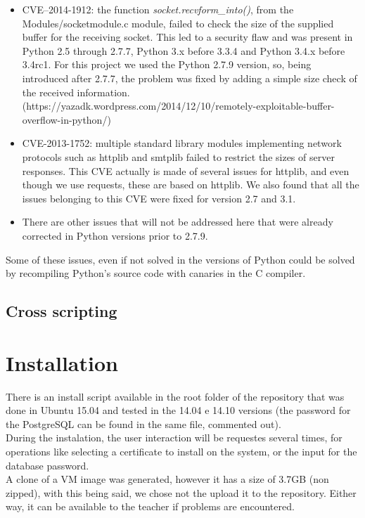 \documentclass[11pt,a4paper]{report}
\begin{document}
\begin{itemize}
    \item CVE–2014-1912: the function \emph{socket.recvform\_into()}, from the Modules/socketmodule.c module, failed to check the size of the supplied buffer for the receiving socket. This led to a security flaw and was present in Python 2.5 through 2.7.7, Python 3.x before 3.3.4 and Python 3.4.x before 3.4rc1. For this project we used the Python 2.7.9 version, so, being introduced after 2.7.7, the problem was fixed by adding a simple size check of the received information. (https://yazadk.wordpress.com/2014/12/10/remotely-exploitable-buffer-overflow-in-python/)
 \item CVE-2013-1752: multiple standard library modules implementing network protocols such as httplib and smtplib failed to restrict the sizes of server responses. This CVE actually is made of several issues for httplib, and even though we use requests, these are based on httplib. We also found that all the issues belonging to this CVE were fixed for version 2.7 and 3.1.
 \item There are other issues that will not be addressed here that were already corrected in Python versions prior to 2.7.9.
\end{itemize}

Some of these issues, even if not solved in the versions of Python could be solved by recompiling Python’s source code with canaries in the C compiler.

\section{Cross scripting}

\chapter{Installation}

There is an install script available in the root folder of the repository that was done in Ubuntu 15.04 and tested in the 14.04 e 14.10 versions (the password for the PostgreSQL can be found in the same file, commented out).\\

During the instalation, the user interaction will be requestes several times, for operations like selecting a certificate to install on the system, or the input for the database password.\\

A clone of a VM image was generated, however it has a size of 3.7GB (non zipped), with this being said, we chose not the upload it to the repository. Either way, it can be available to the teacher if problems are encountered.
\end{document}
